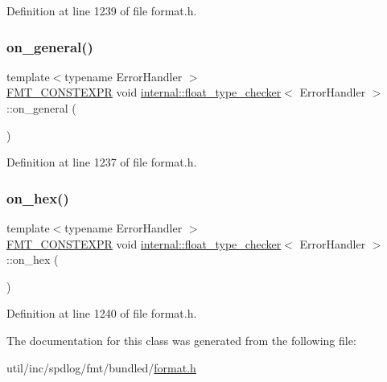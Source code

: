Definition at line 1239 of file format.\+h.

\mbox{\label{classinternal_1_1float__type__checker_a8503b503710b9df4205d41f99c8f9f1b}} 
\subsubsection{\texorpdfstring{on\+\_\+general()}{on\_general()}}
{\footnotesize\ttfamily template$<$typename Error\+Handler $>$ \\
\hyperlink{core_8h_a69201cb276383873487bf68b4ef8b4cd}{F\+M\+T\+\_\+\+C\+O\+N\+S\+T\+E\+X\+PR} void \hyperlink{classinternal_1_1float__type__checker}{internal\+::float\+\_\+type\+\_\+checker}$<$ Error\+Handler $>$\+::on\+\_\+general (\begin{DoxyParamCaption}{ }\end{DoxyParamCaption})\hspace{0.3cm}{\ttfamily [inline]}}



Definition at line 1237 of file format.\+h.

\mbox{\label{classinternal_1_1float__type__checker_a877290cd3cd66c89bccb98dd2fcaf364}} 
\subsubsection{\texorpdfstring{on\+\_\+hex()}{on\_hex()}}
{\footnotesize\ttfamily template$<$typename Error\+Handler $>$ \\
\hyperlink{core_8h_a69201cb276383873487bf68b4ef8b4cd}{F\+M\+T\+\_\+\+C\+O\+N\+S\+T\+E\+X\+PR} void \hyperlink{classinternal_1_1float__type__checker}{internal\+::float\+\_\+type\+\_\+checker}$<$ Error\+Handler $>$\+::on\+\_\+hex (\begin{DoxyParamCaption}{ }\end{DoxyParamCaption})\hspace{0.3cm}{\ttfamily [inline]}}



Definition at line 1240 of file format.\+h.



The documentation for this class was generated from the following file\+:\begin{DoxyCompactItemize}
\item 
util/inc/spdlog/fmt/bundled/\hyperlink{format_8h}{format.\+h}\end{DoxyCompactItemize}
